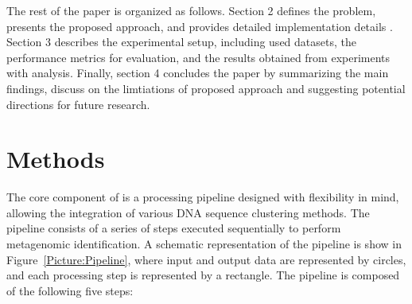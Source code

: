 \documentclass[pdflatex,sn-vancouver-num]{sn-jnl}%
\begin{document}
    The rest of the paper is organized as follows. Section 2 defines the problem, presents the proposed approach, and provides detailed implementation details .
    Section 3 describes the experimental setup, including used datasets, the performance metrics for evaluation, and the results obtained from experiments with analysis.
    Finally, section 4 concludes the paper by summarizing the main findings, discuss on the limtiations of proposed approach and suggesting potential directions for future research.

    \section{Methods}

        The core component of  is a processing pipeline designed with flexibility in mind, allowing the integration of various DNA sequence clustering methods. The pipeline consists of a series of steps executed sequentially to perform metagenomic identification. A schematic representation of the pipeline is show in Figure~\ref{Picture:Pipeline}, where input and output data are represented by circles, and each processing step is represented by a rectangle. The pipeline is composed of the following five steps:
\end{document}
